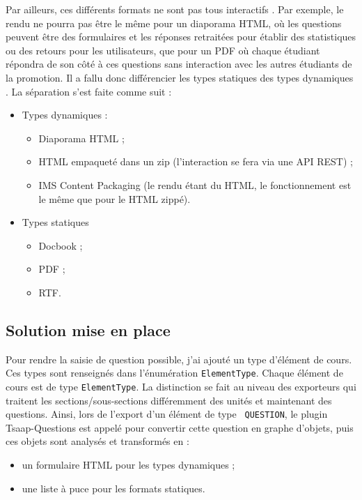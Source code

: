 Par ailleurs, ces différents formats ne sont pas tous \og interactifs \fg{}. Par
exemple, le rendu ne pourra pas être le même pour un diaporama HTML, où les
questions peuvent être des formulaires et les réponses retraitées pour établir
des statistiques ou des retours pour les utilisateurs, que pour un PDF où chaque
étudiant répondra de son côté à ces questions sans interaction avec les autres
étudiants de la promotion. Il a fallu donc différencier les types \og statiques
\fg{} des types \og dynamiques \fg{}. La séparation s'est faite comme suit :
\begin{itemize}
  \item Types dynamiques :
	\begin{itemize}
	  \item Diaporama HTML ;
	  \item HTML empaqueté dans un zip (l'interaction se fera via une API REST) ;
	  \item IMS Content Packaging (le rendu étant du HTML, le fonctionnement est
		le même que pour le HTML zippé).
	\end{itemize}
  \item Types statiques 
	\begin{itemize}
	  \item Docbook ;
	  \item PDF ;
	  \item RTF.
	\end{itemize}
\end{itemize}

\subsection{Solution mise en place}
Pour rendre la saisie de question possible, j'ai ajouté un type d'élément de
cours. Ces types sont renseignés dans l'énumération {\tt ElementType}. Chaque
élément de cours est de type {\tt ElementType}. La distinction se fait au niveau
des exporteurs qui traitent les sections/sous-sections différemment des unités
et maintenant des questions. Ainsi, lors de l'export d'un élément de type {\tt
QUESTION}, le plugin Tsaap-Questions est appelé pour convertir cette question
en graphe d'objets, puis ces objets sont analysés et transformés en :
\begin{itemize}
  \item un formulaire HTML pour les types dynamiques ;
  \item une liste à puce pour les formats statiques.
\end{itemize}



